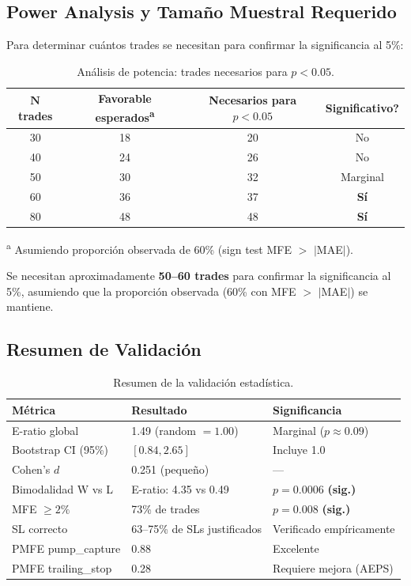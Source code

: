 \documentclass[11pt,a4paper]{article}
\begin{document}
\subsection{Power Analysis y Tama\~no Muestral Requerido}

Para determinar cu\'antos trades se necesitan para confirmar la
significancia al 5\%:

\begin{table}[H]
\centering
\caption{An\'alisis de potencia: trades necesarios para $p < 0.05$.}
\label{tab:power}
\begin{tabular}{cccc}
\toprule
$\bm{N}$ \textbf{trades} & \textbf{Favorable esperados}\textsuperscript{a} &
  \textbf{Necesarios para $p < 0.05$} & \textbf{Significativo?} \\
\midrule
30 & 18 & 20 & No \\
40 & 24 & 26 & No \\
50 & 30 & 32 & Marginal \\
60 & 36 & 37 & \textbf{S\'i} \\
80 & 48 & 48 & \textbf{S\'i} \\
\bottomrule
\end{tabular}

\vspace{4pt}
{\small \textsuperscript{a} Asumiendo proporci\'on observada de 60\% (sign test MFE $>$ $|$MAE$|$).}
\end{table}

Se necesitan aproximadamente \textbf{50--60 trades} para confirmar
la significancia al 5\%, asumiendo que la proporci\'on observada
(60\% con MFE $>$ $|$MAE$|$) se mantiene.


\subsection{Resumen de Validaci\'on}

\begin{table}[H]
\centering
\caption{Resumen de la validaci\'on estad\'istica.}
\label{tab:validation_summary}
\begin{tabularx}{\textwidth}{lXl}
\toprule
\textbf{M\'etrica} & \textbf{Resultado} & \textbf{Significancia} \\
\midrule
E-ratio global & 1.49 (random $= 1.00$) & Marginal ($p \approx 0.09$) \\
Bootstrap CI (95\%) & $[0.84, 2.65]$ & Incluye 1.0 \\
Cohen's $d$ & 0.251 (peque\~no) & --- \\
\midrule
Bimodalidad W vs L & E-ratio: 4.35 vs 0.49 & $p = 0.0006$ \textbf{(sig.)} \\
MFE $\geq 2\%$ & 73\% de trades & $p = 0.008$ \textbf{(sig.)} \\
\midrule
SL correcto & 63--75\% de SLs justificados & Verificado emp\'iricamente \\
PMFE pump\_capture & 0.88 & Excelente \\
PMFE trailing\_stop & 0.28 & Requiere mejora (AEPS) \\
\bottomrule
\end{tabularx}
\end{table}
\end{document}
